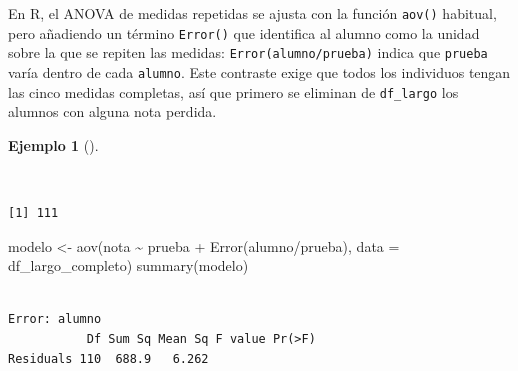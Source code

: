 \documentclass[
  spanish,
  a4paper,
]{scrreport}
\newenvironment{Shaded}{\begin{snugshade}}{\end{snugshade}}
\newcommand{\AttributeTok}[1]{\textcolor[rgb]{0.40,0.45,0.13}{#1}}
\newcommand{\FunctionTok}[1]{\textcolor[rgb]{0.28,0.35,0.67}{#1}}
\newcommand{\NormalTok}[1]{\textcolor[rgb]{0.00,0.23,0.31}{#1}}
\newcommand{\OtherTok}[1]{\textcolor[rgb]{0.00,0.23,0.31}{#1}}
\newcommand{\SpecialCharTok}[1]{\textcolor[rgb]{0.37,0.37,0.37}{#1}}
\theoremstyle{definition}
\newtheorem{example}{Ejemplo}[chapter]
\theoremstyle{definition}
\theoremstyle{remark}
\begin{document}
En R, el ANOVA de medidas repetidas se ajusta con la función
\texttt{aov()} habitual, pero añadiendo un término \texttt{Error()} que
identifica al alumno como la unidad sobre la que se repiten las medidas:
\texttt{Error(alumno/prueba)} indica que \texttt{prueba} varía dentro de
cada \texttt{alumno}. Este contraste exige que todos los individuos
tengan las cinco medidas completas, así que primero se eliminan de
\texttt{df\_largo} los alumnos con alguna nota perdida.

\begin{example}[]\protect\hypertarget{exm-medidasrepetidas-anova}{}\label{exm-medidasrepetidas-anova}

~

\begin{Shaded}
\end{Shaded}

\begin{verbatim}
[1] 111
\end{verbatim}

\begin{Shaded}
\begin{Highlighting}[]
\NormalTok{modelo }\OtherTok{\textless{}{-}} \FunctionTok{aov}\NormalTok{(nota }\SpecialCharTok{\textasciitilde{}}\NormalTok{ prueba }\SpecialCharTok{+} \FunctionTok{Error}\NormalTok{(alumno}\SpecialCharTok{/}\NormalTok{prueba), }\AttributeTok{data =}\NormalTok{ df\_largo\_completo)}
\FunctionTok{summary}\NormalTok{(modelo)}
\end{Highlighting}
\end{Shaded}

\begin{verbatim}

Error: alumno
           Df Sum Sq Mean Sq F value Pr(>F)
Residuals 110  688.9   6.262               


\end{verbatim}
\end{example}
\end{document}
